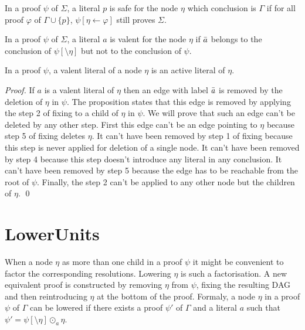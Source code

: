 \documentclass{llncs}
\begin{document}

\begin{definition}
In a proof $\psi$ of $\Sigma$, a literal $p$ is safe for the node $\eta$ which conclusion is $\Gamma$ if
for all proof $\varphi$ of $\Gamma \cup \{p\}$, $\psi[\eta \leftarrow \varphi]$ still proves $\Sigma$.
\end{definition}

\begin{definition}
In a proof $\psi$ of $\Sigma$, a literal $a$ is valent for the node $\eta$ if $\bar{a}$ belongs to
the conclusion of $\psi[\setminus \eta]$ but not to the conclusion of $\psi$.
\end{definition}

\begin{proposition}
In a proof $\psi$, a valent literal of a node $\eta$ is an active literal of $\eta$.
\end{proposition}

\begin{proof}
If $a$ is a valent literal of $\eta$ then an edge with label $\bar{a}$ is removed by the deletion of
$\eta$ in $\psi$. The proposition states that this edge is removed by applying the step 2 of fixing
to a child of $\eta$ in $\psi$. We will prove that such an edge can't be deleted by any other step.
First this edge can't be an edge pointing to $\eta$ because step 5 of fixing deletes $\eta$.
It can't have been removed by step 1 of fixing because this step is never applied for deletion of a
single node.
It can't have been removed by step 4 because this step doesn't introduce any literal in any conclusion.
It can't have been removed by step 5 because the edge has to be reachable from the root of $\psi$.
Finally, the step 2 can't be applied to any other node but the children
of $\eta$. \qed
\end{proof}



\section{LowerUnits}

When a node $\eta$ as more than one child in a proof $\psi$ it might be convenient to factor the
corresponding resolutions. Lowering $\eta$ is such a factorisation. A new equivalent proof is
constructed by removing $\eta$ from $\psi$, fixing the resulting DAG and then reintroducing $\eta$
at the bottom of the proof. Formaly, a node $\eta$ in a proof $\psi$ of $\Gamma$ can be lowered if
there exists a proof $\psi'$ of $\Gamma$ and a literal $a$ such that $\psi' = \psi[\setminus \eta]
\odot_a \eta$.
\end{document}
